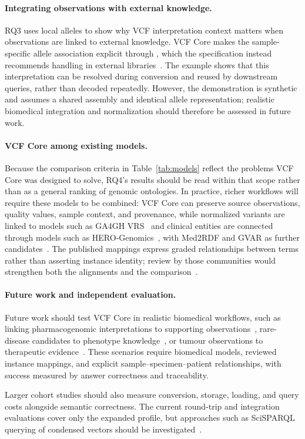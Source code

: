 \paragraph{Integrating observations with external knowledge.}
RQ3 uses local alleles to show why VCF interpretation context matters when observations are linked to external knowledge. 
VCF Core makes the sample-specific allele association explicit through , which the specification instead recommends handling in external libraries~\cite{vcf45}.
The example shows that this interpretation can be resolved during conversion and reused by downstream queries, rather than decoded repeatedly. 
However, the demonstration is synthetic and assumes a shared assembly and identical allele representation; realistic biomedical integration and normalization should therefore be assessed in future work.

\paragraph{VCF Core among existing models.}
Because the comparison criteria in Table~\ref{tab:models} reflect the problems VCF Core was designed to solve, RQ4's results should be read within that scope rather than as a general ranking of genomic ontologies. 
In practice, richer workflows will require these models to be combined: VCF Core can preserve source observations, quality values, sample context, and provenance, while normalized variants are linked to models such as GA4GH VRS~\cite{wagner2021vrs} and clinical entities are connected through models such as HERO-Genomics~\cite{cazzaro2025hero}, with Med2RDF and GVAR as further candidates~\cite{med2rdf,gvar}. 
The published mappings express graded relationships between terms rather than asserting instance identity; review by those communities would strengthen both the alignments and the comparison~\cite{smith2007obo}.

\paragraph{Future work and independent evaluation.}
\label{sec:clinicalqueries}
Future work should test VCF Core in realistic biomedical workflows, such as linking pharmacogenomic interpretations to supporting observations~\cite{lee2022cpic,pharmcatmethods}, rare-disease candidates to phenotype knowledge~\cite{hpo,putman2024monarch}, or tumour observations to therapeutic evidence~\cite{griffith2017civic}. 
These scenarios require biomedical models, reviewed instance mappings, and explicit sample--specimen--patient relationships, with success measured by answer correctness and traceability.

Larger cohort studies should also measure conversion, storage, loading, and query costs alongside semantic correctness. 
The current round-trip and integration evaluations cover only the expanded profile, but approaches such as SciSPARQL querying of condensed vectors should be investigated~\cite{andrejev2012scisparql}.

